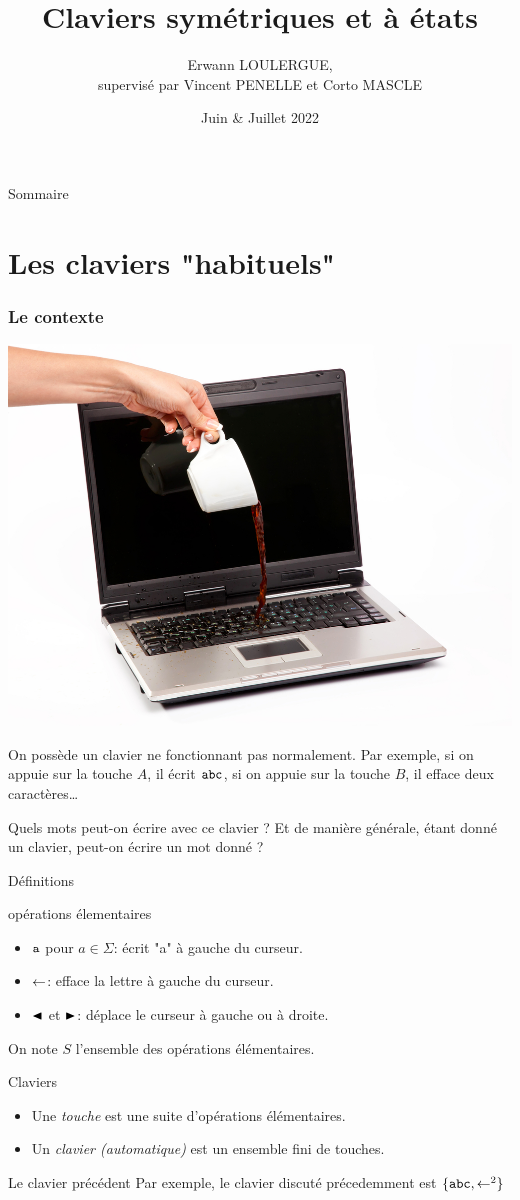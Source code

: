 \documentclass[11pt,french]{beamer}
\title{Claviers symétriques et à états}
\author[Erwann LOULERGUE]{Erwann LOULERGUE, \texorpdfstring{\\supervisé par Vincent PENELLE et Corto MASCLE}{}}
\date{Juin \& Juillet 2022}
\institute[ENS Paris-Saclay]{Au LaBRI}
\begin{document}
\begin{frame}
	\titlepage
\end{frame}

\begin{frame}{Sommaire}
	\tableofcontents
\end{frame}

\section{Les claviers "habituels"}
\begin{frame}
	\frametitle{Le contexte}
	\begin{center}
		\includegraphics[height=0.3\textwidth]{Drame.jpg}	
	\end{center}

	On possède un clavier ne fonctionnant pas normalement. Par exemple, si on appuie sur la touche $A$, il écrit $\mathtt{abc}$, si on appuie sur la touche $B$, il efface deux caractères\dots

	Quels mots peut-on écrire avec ce clavier ? Et de manière générale, étant donné un clavier, peut-on écrire un mot donné ?

\end{frame}
\begin{frame}{Définitions}
	\begin{block}{opérations élementaires}
		\begin{itemize}
			\item $\mathtt{a}$ pour $a \in \Sigma$: écrit "a" à gauche du curseur. \pause
			\item $\mathord{\leftarrow}$: efface la lettre à gauche du curseur. \pause
			\item $\mathord{\blacktriangleleft}$ et $\mathord{\blacktriangleright}$: déplace le curseur à gauche ou à droite.
		\end{itemize}
	\end{block}
	On note $S$ l'ensemble des opérations élémentaires.
	\pause
	\begin{block}{Claviers}
		\begin{itemize}
			\item Une \emph{touche} est une suite d'opérations élémentaires. \pause
			\item Un \emph{clavier (automatique)} est un ensemble fini de touches.
		\end{itemize}
	\end{block}
	\begin{exampleblock}{Le clavier précédent}
		Par exemple, le clavier discuté précedemment est $\{\mathtt{abc},\mathord{\leftarrow}^2\}$
	\end{exampleblock}
\end{frame}
\end{document}
